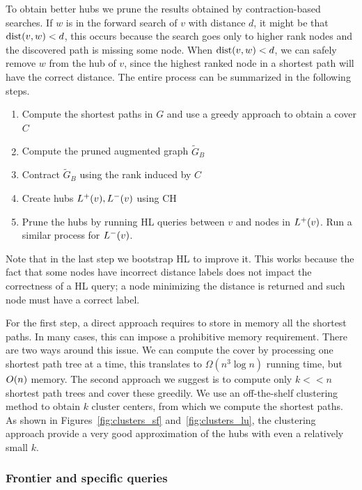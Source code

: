 To obtain better hubs we prune the results obtained by contraction-based searches.
If $w$ is in the forward search of $v$ with distance $d$, it might be that $\text{dist}(v,w)<d$, this occurs because the search goes only to higher rank nodes and the discovered path is missing some node.
When $\text{dist}(v,w)<d$, we can safely remove $w$ from the hub of $v$, since the highest ranked node in a shortest path will have the correct distance.
The entire process can be summarized in the following steps.

\begin{enumerate}[nosep]
\item Compute the shortest paths in $G$ and use a greedy approach to obtain a cover $C$
\item Compute the pruned augmented graph $\tilde G_B$
\item Contract $\tilde G_B$ using the rank induced by $C$
\item Create hubs $L^+(v),L^-(v)$ using CH
\item Prune the hubs by running HL queries between $v$ and nodes in $L^+(v)$. 
Run a similar process for $L^-(v)$.
\end{enumerate}
Note that in the last step we bootstrap HL to improve it.
This works because the fact that some nodes have incorrect distance labels does not impact the correctness of a HL query; a node minimizing the distance is returned and such node must have a correct label.

\begin{remark}
For the first step, a direct approach requires to store in memory all the shortest paths.
In many cases, this can impose a prohibitive memory requirement.
There are two ways around this issue.
We can compute the cover by processing one shortest path tree at a time, this translates to $\Omega(n^3\log n)$ running time, but $O(n)$ memory.
The second approach we suggest is to compute only $k<<n$ shortest path trees and cover these greedily.
We use an off-the-shelf clustering method to obtain $k$ cluster centers, from which we compute the shortest paths. 
As shown in Figures~\ref{fig:clusters_sf} and~\ref{fig:clusters_lu}, the clustering approach provide a very good approximation of the hubs with even a relatively small $k$.
\end{remark}

\subsubsection{Frontier and specific queries}

